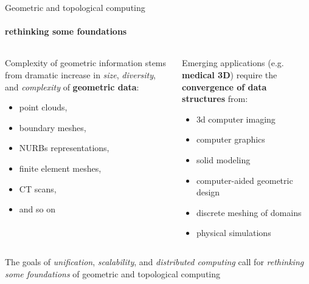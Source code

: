 \begin{frame}{Geometric and topological computing}
\protect\hypertarget{geometric-and-topological-computing}{}

\framesubtitle{rethinking some foundations}

\begin{columns}[T]
\begin{column}{0.48\textwidth}
Complexity of geometric information stems from dramatic increase in
\emph{size}, \emph{diversity}, and \emph{complexity} of
\textbf{geometric data}:

\begin{itemize}
\item
  point clouds,
\item
  boundary meshes,
\item
  NURBs representations,
\item
  finite element meshes,
\item
  CT scans,
\item
  and so on
\end{itemize}
\end{column}

\begin{column}{0.48\textwidth}
Emerging applications (e.g. \textbf{medical 3D}) require the
\textbf{convergence of data structures} from:

\begin{itemize}
\item
  3d computer imaging
\item
  computer graphics
\item
  solid modeling
\item
  computer-aided geometric design
\item
  discrete meshing of domains
\item
  physical simulations
\end{itemize}
\end{column}
\end{columns}

The goals of \emph{unification}, \emph{scalability}, and
\emph{distributed computing} call for \emph{rethinking some foundations}
of geometric and topological computing

\end{frame}

